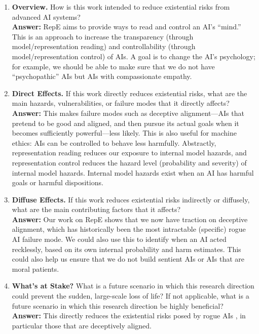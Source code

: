\begin{enumerate}
\item \textbf{Overview.} How is this work intended to reduce existential risks from advanced AI systems? \\
\textbf{Answer:} RepE aims to provide ways to read and control an AI's ``mind.'' This is an approach to increase the transparency (through model/representation reading) and controllability 
 (through model/representation control) of AIs. A goal is to change the AI's psychology; for example, we should be able to make sure that we do not have ``psychopathic'' AIs but AIs with compassionate empathy.

\item \textbf{Direct Effects.} If this work directly reduces existential risks, what are the main hazards, vulnerabilities, or failure modes that it directly affects? \\
\textbf{Answer:} This makes failure modes such as deceptive alignment---AIs that pretend to be good and aligned, and then pursue its actual goals when it becomes sufficiently powerful---less likely. This is also useful for machine ethics: AIs can be controlled to behave less harmfully. Abstractly, representation reading reduces our exposure to internal model hazards, and representation control reduces the hazard level (probability and severity) of internal model hazards. Internal model hazards exist when an AI has harmful goals or harmful dispositions.

\item \textbf{Diffuse Effects.} If this work reduces existential risks indirectly or diffusely, what are the main contributing factors that it affects? \\
\textbf{Answer:} Our work on RepE shows that we now have traction on deceptive alignment, which has historically been the most intractable (specific) rogue AI failure mode. We could also use this to identify when an AI acted recklessly, based on its own internal probability and harm estimates. This could also help us ensure that we do not build sentient AIs or AIs that are moral patients. %

\item \textbf{What’s at Stake?} What is a future scenario in which this research direction could prevent the sudden, large-scale loss of life? If not applicable, what is a future scenario in which this research
direction be highly beneficial? \\
\textbf{Answer:} This directly reduces the existential risks posed by rogue AIs \citep{Carlsmith2022IsPA}, in particular those that are deceptively aligned.


\end{enumerate}
